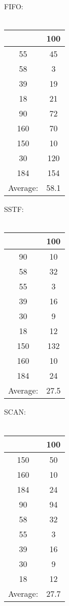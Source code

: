 \documentclass{article}
\begin{document}
\vspace{0.5cm}
\begin{minipage}[t]{0.25\textwidth}
FIFO:\\\\
\begin{tabular}{c|c}
& 100\\
\hline
55 & 45\\
58 & 3\\
39 & 19\\
18 & 21\\
90 & 72\\
160 & 70\\
150 & 10\\
30 & 120\\
184 & 154\\
\hline
Average: & 58.1
\end{tabular}
\end{minipage}
\begin{minipage}[t]{0.25\textwidth}
SSTF:\\\\
\begin{tabular}{c|c}
& 100\\
\hline
90 & 10\\
58 & 32\\
55 & 3\\
39 & 16\\
30 & 9\\
18 & 12\\
150 & 132\\
160 & 10\\
184 & 24\\
\hline
Average: & 27.5
\end{tabular}
\end{minipage}
\begin{minipage}[t]{0.25\textwidth}
SCAN:\\\\
\begin{tabular}{c|c}
& 100\\
\hline
150 & 50\\
160 & 10\\
184 & 24\\
90 & 94\\
58 & 32\\
55 & 3\\
39 & 16\\
30 & 9\\
18 & 12\\
\hline
Average: & 27.7
\end{tabular}
\end{minipage}
\end{document}
